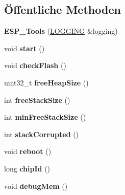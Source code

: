 \subsection*{Öffentliche Methoden}
\begin{DoxyCompactItemize}
\item 
\mbox{\label{class_e_s_p___tools_a70230375980fbcb6b5154b9e87d0f617}} 
{\bfseries E\+S\+P\+\_\+\+Tools} (\hyperlink{class_l_o_g_g_i_n_g}{L\+O\+G\+G\+I\+NG} \&logging)
\item 
\mbox{\label{class_e_s_p___tools_af6a83ab4830f92bd5bf0b1460a7a1553}} 
void {\bfseries start} ()
\item 
\mbox{\label{class_e_s_p___tools_af58fdfd7804981844fbf07e141e396b0}} 
void {\bfseries check\+Flash} ()
\item 
\mbox{\label{class_e_s_p___tools_a3e2615d579fdf7ba506688bdd7120829}} 
uint32\+\_\+t {\bfseries free\+Heap\+Size} ()
\item 
\mbox{\label{class_e_s_p___tools_acd4f396bca818ab4a78f6b8e1234c2a3}} 
int {\bfseries free\+Stack\+Size} ()
\item 
\mbox{\label{class_e_s_p___tools_ade1b1654d11a791ba10d8f4640a201fb}} 
int {\bfseries min\+Free\+Stack\+Size} ()
\item 
\mbox{\label{class_e_s_p___tools_a6175eb4c33b712fddfd11ccc7ed85782}} 
int {\bfseries stack\+Corrupted} ()
\item 
\mbox{\label{class_e_s_p___tools_a50c09160ce0c1e4cc6bff4930d356464}} 
void {\bfseries reboot} ()
\item 
\mbox{\label{class_e_s_p___tools_ac55019c85998abf78d6274c1a816d328}} 
long {\bfseries chip\+Id} ()
\item 
\mbox{\label{class_e_s_p___tools_a09caa3deb4384348fee4a86c39d39da3}} 
void {\bfseries debug\+Mem} ()
\item 
\mbox{\label{class_e_s_p___tools_ab9da9f4645baf25b8d6b7371a84891d9}} 

\end{DoxyCompactItemize}
